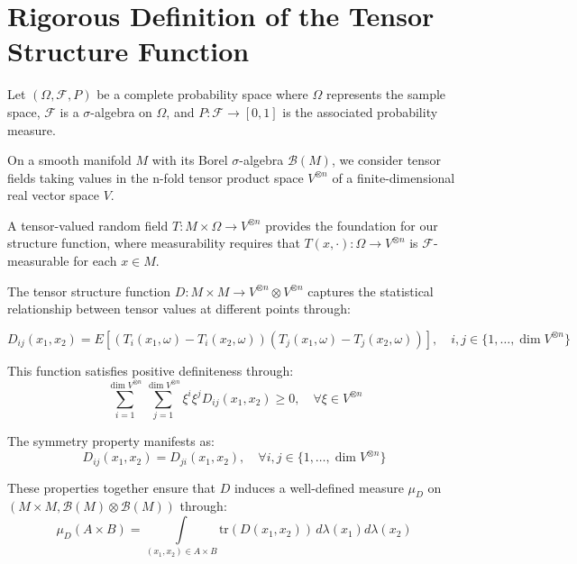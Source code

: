 \documentclass{article}
\begin{document}
\section{Rigorous Definition of the Tensor Structure Function}

Let $(\Omega, \mathcal{F}, P)$ be a complete probability space where $\Omega$ represents the sample space, $\mathcal{F}$ is a $\sigma$-algebra on $\Omega$, and $P: \mathcal{F} \to [0,1]$ is the associated probability measure.

On a smooth manifold $M$ with its Borel $\sigma$-algebra $\mathcal{B}(M)$, we consider tensor fields taking values in the n-fold tensor product space $V^{\otimes n}$ of a finite-dimensional real vector space $V$.

A tensor-valued random field $T: M \times \Omega \to V^{\otimes n}$ provides the foundation for our structure function, where measurability requires that $T(x,\cdot): \Omega \to V^{\otimes n}$ is $\mathcal{F}$-measurable for each $x \in M$.

The tensor structure function $D: M \times M \to V^{\otimes n} \otimes V^{\otimes n}$ captures the statistical relationship between tensor values at different points through:

\begin{equation}
D_{ij}(x_1,x_2) = E[(T_i(x_1,\omega) - T_i(x_2,\omega))(T_j(x_1,\omega) - T_j(x_2,\omega))], \quad i,j \in \{1,\ldots,\dim V^{\otimes n}\}
\end{equation}

This function satisfies positive definiteness through:
\begin{equation}
\sum_{i=1}^{\dim V^{\otimes n}} \sum_{j=1}^{\dim V^{\otimes n}} \xi^i\xi^jD_{ij}(x_1,x_2) \geq 0, \quad \forall \xi \in V^{\otimes n}
\end{equation}

The symmetry property manifests as:
\begin{equation}
D_{ij}(x_1,x_2) = D_{ji}(x_1,x_2), \quad \forall i,j \in \{1,\ldots,\dim V^{\otimes n}\}
\end{equation}

These properties together ensure that $D$ induces a well-defined measure $\mu_D$ on $(M \times M, \mathcal{B}(M) \otimes \mathcal{B}(M))$ through:
\begin{equation}
\mu_D(A \times B) = \int\limits_{(x_1,x_2) \in A \times B} \text{tr}(D(x_1,x_2)) \, d\lambda(x_1)d\lambda(x_2)
\end{equation}
\end{document}
